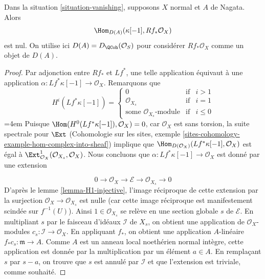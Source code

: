 \begin{lemma} \label{lemma-R1-injective} Dans la situation \ref{situation-vanishing}, supposons $X$ normal et $A$ de Nagata. Alors $$
\Hom_{D(A)}(\kappa[-1], Rf_*\mathcal{O}_X)
$$ est nul. On utilise ici $D(A) = D_\QCoh(\mathcal{O}_S)$ pour considérer $Rf_*\mathcal{O}_X$ comme un objet de $D(A)$. \end{lemma}

\begin{proof} Par adjonction entre $Rf_*$ et $Lf^*$, une telle application équivaut à une application $\alpha : Lf^*\kappa[-1] \to \mathcal{O}_X$. Remarquons que $$
H^i(Lf^*\kappa[-1]) =
\left\{
\begin{matrix}
0 & \text{if} & i > 1 \\
\mathcal{O}_{X_s} & \text{if} & i = 1 \\
\text{some }\mathcal{O}_{X_s}\text{-module} & \text{if} & i \leq 0
\end{matrix}
\right.
$$
\begingroup\emergencystretch=4em
Puisque $\Hom(H^0(Lf^*\kappa[-1]), \mathcal{O}_X) = 0$, car $\mathcal{O}_X$ est sans torsion, la suite spectrale pour $\Ext$ (Cohomologie sur les sites, exemple \ref{sites-cohomology-example-hom-complex-into-sheaf}) implique que $\Hom_{D(\mathcal{O}_X)}(Lf^*\kappa[-1], \mathcal{O}_X)$ est égal à $\Ext^1_{\mathcal{O}_X}(\mathcal{O}_{X_s}, \mathcal{O}_X)$. Nous concluons que $\alpha : Lf^*\kappa[-1] \to \mathcal{O}_X$ est donné par une extension\par\endgroup
$$
0 \to \mathcal{O}_X \to \mathcal{E} \to \mathcal{O}_{X_s} \to 0
$$ D'après le lemme \ref{lemma-H1-injective}, l'image réciproque de cette extension par la surjection $\mathcal{O}_X \to \mathcal{O}_{X_s}$ est nulle (car cette image réciproque est manifestement scindée sur $f^{-1}(U)$). Ainsi $1 \in \mathcal{O}_{X_s}$ se relève en une section globale $s$ de $\mathcal{E}$. En multipliant $s$ par le faisceau d'idéaux $\mathcal{I}$ de $X_s$, on obtient une application de $\mathcal{O}_X$-modules $c_s : \mathcal{I} \to \mathcal{O}_X$. En appliquant $f_*$, on obtient une application $A$-linéaire $f_*c_s : \mathfrak m \to A$. Comme $A$ est un anneau local noethérien normal intègre, cette application est donnée par la multiplication par un élément $a \in A$. En remplaçant $s$ par $s -  a$, on trouve que $s$ est annulé par $\mathcal{I}$ et que l'extension est triviale, comme souhaité. \end{proof}

